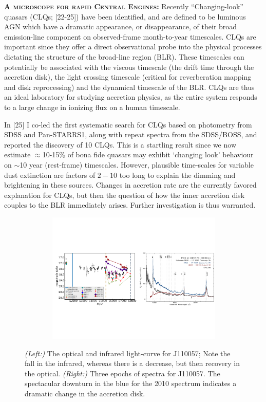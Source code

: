\documentclass[oneside, a4paper, onecolumn, 11pt]{article}
\begin{document}
\smallskip \smallskip
\smallskip
\smallskip
\noindent
\textbf{\textsc{A microscope for rapid Central Engines:}}
Recently ``Changing-look'' quasars (CLQs; [22-25]) have been
identified, and are defined to be luminous AGN which have a dramatic
appearance, or disappearance, of their broad emission-line component
on observed-frame month-to-year timescales.  CLQs are important since
they offer a direct observational probe into the physical processes
dictating the structure of the broad-line region (BLR). These
timescales can potentially be associated with the viscous timescale
(the drift time through the accretion disk), the light crossing
timescale (critical for reverberation mapping and disk reprocessing)
and the dynamical timescale of the BLR.  CLQs are thus an ideal
laboratory for studying accretion physics, as the entire system
responds to a large change in ionizing flux on a human timescale.

\smallskip \smallskip
\noindent 
In [25] I co-led the first systematic search for CLQs based on
photometry from SDSS and Pan-STARRS1, along with repeat spectra from
the SDSS/BOSS, and reported the discovery of 10 CLQs. This is a
startling result since we now estimate $\approx$10-15\% of bona fide
quasars may exhibit `changing look' behaviour on $\sim$10 year 
(rest-frame) timescales. However, plausible time-scales for variable
dust extinction are factors of $2-10$ too long to explain the dimming
and brightening in these sources.  Changes in accretion rate are the
currently favored explanation for CLQs, but then the question of how
the inner accretion disk couples to the BLR immediately
arises. Further investigation is thus warranted.

\begin{figure}[h]
  \begin{center}
    \hspace{-0.5cm}
    \includegraphics[height=6.25cm,width=17.2cm]
    {figures/J110057_LC_Spectra_20171024.pdf}
    \vspace{-10pt}
    \caption{%
      \footnotesize 
      {\it (Left:)} The optical and infrared light-curve for J110057; 
      Note the fall in the infrared, whereas there is a decrease, but 
      then recovery in the optical. 
      {\it (Right:)} 
      Three epochs of spectra for J110057. 
      The spectacular downturn in the blue for the 2010 spectrum 
      indicates a dramatic change in the accretion disk.
    }
  \vspace{-16pt}
 \label{fig:J110057}
\end{center}
\end{figure}
\end{document}
